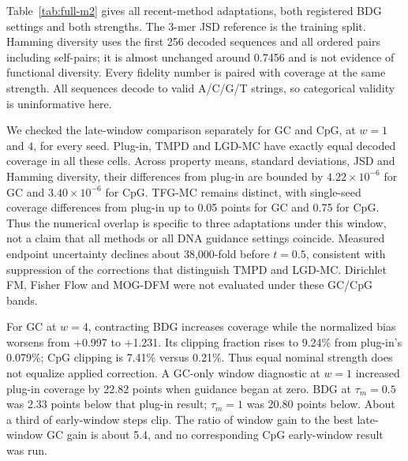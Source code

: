 \documentclass{article}
\begin{document}
Table~\ref{tab:full-m2} gives all recent-method adaptations, both registered BDG settings and both strengths. The 3-mer JSD reference is the training split. Hamming diversity uses the first 256 decoded sequences and all ordered pairs including self-pairs; it is almost unchanged around 0.7456 and is not evidence of functional diversity. Every fidelity number is paired with coverage at the same strength. All sequences decode to valid A/C/G/T strings, so categorical validity is uninformative here.

We checked the late-window comparison separately for GC and CpG, at $w=1$ and $4$, for every seed. Plug-in, TMPD and LGD-MC have exactly equal decoded coverage in all these cells. Across property means, standard deviations, JSD and Hamming diversity, their differences from plug-in are bounded by $4.22\times10^{-6}$ for GC and $3.40\times10^{-6}$ for CpG. TFG-MC remains distinct, with single-seed coverage differences from plug-in up to 0.05 points for GC and 0.75 for CpG. Thus the numerical overlap is specific to three adaptations under this window, not a claim that all methods or all DNA guidance settings coincide. Measured endpoint uncertainty declines about 38,000-fold before $t=0.5$, consistent with suppression of the corrections that distinguish TMPD and LGD-MC. Dirichlet FM, Fisher Flow and MOG-DFM were not evaluated under these GC/CpG bands.

For GC at $w=4$, contracting BDG increases coverage while the normalized bias worsens from +0.997 to +1.231. Its clipping fraction rises to 9.24\% from plug-in's 0.079\%; CpG clipping is 7.41\% versus 0.21\%. Thus equal nominal strength does not equalize applied correction. A GC-only window diagnostic at $w=1$ increased plug-in coverage by 22.82 points when guidance began at zero. BDG at $\tau_m=0.5$ was 2.33 points below that plug-in result; $\tau_m=1$ was 20.80 points below. About a third of early-window steps clip. The ratio of window gain to the best late-window GC gain is about 5.4, and no corresponding CpG early-window result was run.
\end{document}
